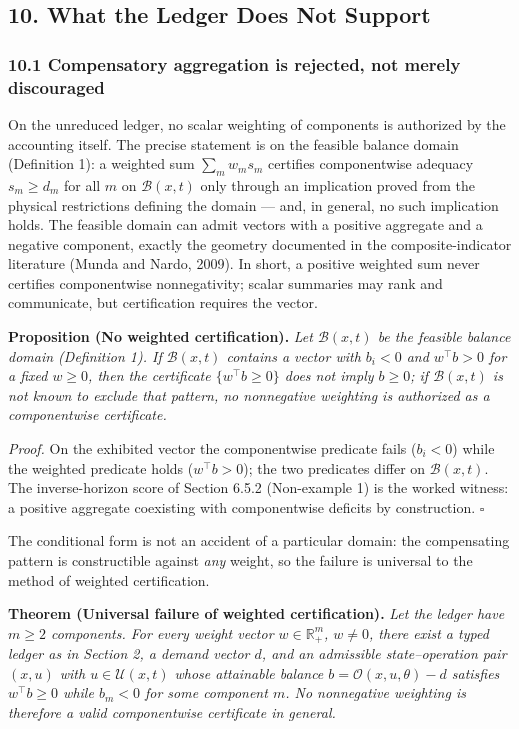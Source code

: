 \documentclass[11pt]{article}
\begin{document}
\subsection{10. What the Ledger Does Not
Support}\label{what-the-ledger-does-not-support}

\subsubsection{10.1 Compensatory aggregation is rejected, not merely
discouraged}\label{compensatory-aggregation-is-rejected-not-merely-discouraged}

On the unreduced ledger, no scalar weighting of components is authorized
by the accounting itself. The precise statement is on the feasible
balance domain (Definition 1): a weighted sum \(\sum_m w_m s_m\)
certifies componentwise adequacy \(s_m \ge d_m\) for all \(m\) on
\(\mathcal{B}(x,t)\) only through an implication proved from the
physical restrictions defining the domain --- and, in general, no such
implication holds. The feasible domain can admit vectors with a positive
aggregate and a negative component, exactly the geometry documented in
the composite-indicator literature (Munda and Nardo, 2009). In short, a
positive weighted sum never certifies componentwise nonnegativity;
scalar summaries may rank and communicate, but certification requires
the vector.

\textbf{Proposition (No weighted certification).} \emph{Let
\(\mathcal{B}(x,t)\) be the feasible balance domain (Definition 1). If
\(\mathcal{B}(x,t)\) contains a vector with \(b_i < 0\) and
\(w^\top b > 0\) for a fixed \(w \ge 0\), then the certificate
\(\{w^\top b \ge 0\}\) does not imply \(b \ge 0\); if
\(\mathcal{B}(x,t)\) is not known to exclude that pattern, no
nonnegative weighting is authorized as a componentwise certificate.}

\emph{Proof.} On the exhibited vector the componentwise predicate fails
(\(b_i < 0\)) while the weighted predicate holds (\(w^\top b > 0\)); the
two predicates differ on \(\mathcal{B}(x,t)\). The inverse-horizon score
of Section 6.5.2 (Non-example 1) is the worked witness: a positive
aggregate coexisting with componentwise deficits by construction. \ensuremath{\square}

The conditional form is not an accident of a particular domain: the
compensating pattern is constructible against \emph{any} weight, so the
failure is universal to the method of weighted certification.

\textbf{Theorem (Universal failure of weighted certification).}
\emph{Let the ledger have \(m \ge 2\) components. For every weight
vector \(w \in \mathbb{R}_+^m\), \(w \neq 0\), there exist a typed
ledger as in Section 2, a demand vector \(d\), and an admissible
state--operation pair \((x, u)\) with \(u \in \mathcal{U}(x,t)\) whose
attainable balance \(b = \mathcal{O}(x,u,\theta) - d\) satisfies
\(w^\top b \ge 0\) while \(b_m < 0\) for some component \(m\). No
nonnegative weighting is therefore a valid componentwise certificate in
general.}
\end{document}
